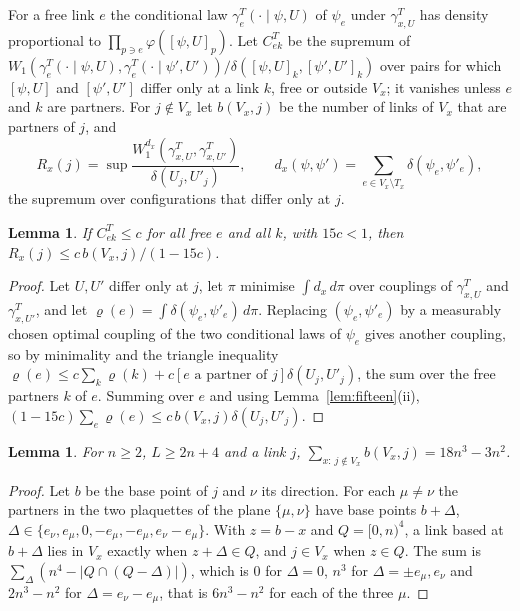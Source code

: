 \documentclass[11pt]{amsart}
\newtheorem{lemma}[theorem]{Lemma}
\theoremstyle{definition}
\theoremstyle{remark}
\numberwithin{equation}{section}
\begin{document}
For a free link $e$ the conditional law $\gamma^T_e(\cdot\mid\psi,U)$ of
$\psi_e$ under $\gamma^T_{x,U}$ has density proportional to $\prod_{p\ni e}
\varphi([\psi,U]_p)$. Let $C^T_{ek}$ be the supremum of $W_1(\gamma^T_e(\cdot
\mid\psi,U),\gamma^T_e(\cdot\mid\psi',U'))/\delta([\psi,U]_k,[\psi',U']_k)$ over
pairs for which $[\psi,U]$ and $[\psi',U']$ differ only at a link $k$, free or
outside $V_x$; it vanishes unless $e$ and $k$ are partners. For $j\notin V_x$
let $b(V_x,j)$ be the number of links of $V_x$ that are partners of $j$, and
\[
R_x(j)=\sup\frac{W_1^{d_x}(\gamma^T_{x,U},\gamma^T_{x,U'})}{\delta(U_j,U'_j)},
\qquad d_x(\psi,\psi')=\sum_{e\in V_x\setminus T_x}\delta(\psi_e,\psi'_e),
\]
the supremum over configurations that differ only at $j$.

\begin{lemma}\label{lem:bpblock}
If $C^T_{ek}\le c$ for all free $e$ and all $k$, with $15c<1$, then
$R_x(j)\le c\,b(V_x,j)/(1-15c)$.
\end{lemma}

\begin{proof}
Let $U,U'$ differ only at $j$, let $\pi$ minimise $\int d_x\,d\pi$ over
couplings of $\gamma^T_{x,U}$ and $\gamma^T_{x,U'}$, and let $\varrho(e)=\int
\delta(\psi_e,\psi'_e)\,d\pi$. Replacing $(\psi_e,\psi'_e)$ by a measurably
chosen optimal coupling of the two conditional laws of $\psi_e$
\cite[Cor.~5.22]{Vil09} gives another coupling, so by minimality and the
triangle inequality $\varrho(e)\le c\sum_k\varrho(k)+c[e\text{ a partner of }j]
\delta(U_j,U'_j)$, the sum over the free partners $k$ of $e$. Summing over $e$
and using Lemma~\ref{lem:fifteen}(ii), $(1-15c)\sum_e\varrho(e)\le
c\,b(V_x,j)\delta(U_j,U'_j)$.
\end{proof}

\begin{lemma}\label{lem:bpcount}
For $n\ge2$, $L\ge2n+4$ and a link $j$, $\sum_{x:\,j\notin V_x}b(V_x,j)=
18n^3-3n^2$.
\end{lemma}

\begin{proof}
Let $b$ be the base point of $j$ and $\nu$ its direction. For each $\mu\ne\nu$
the partners in the two plaquettes of the plane $\{\mu,\nu\}$ have base points
$b+\Delta$, $\Delta\in\{e_\nu,e_\mu,0,-e_\mu,-e_\mu,e_\nu-e_\mu\}$. With $z=b-x$
and $Q=[0,n)^4$, a link based at $b+\Delta$ lies in $V_x$ exactly when $z+\Delta\in
Q$, and $j\in V_x$ when $z\in Q$. The sum is $\sum_\Delta(n^4-|Q\cap(Q-\Delta)|)$,
which is $0$ for $\Delta=0$, $n^3$ for $\Delta=\pm e_\mu,e_\nu$ and $2n^3-n^2$ for
$\Delta=e_\nu-e_\mu$, that is $6n^3-n^2$ for each of the three $\mu$.
\end{proof}
\end{document}
